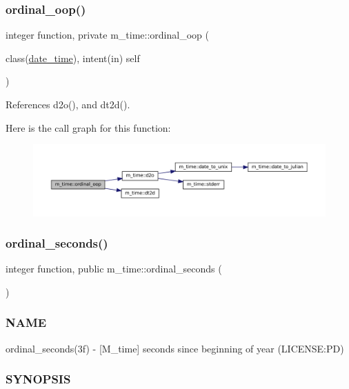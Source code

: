 \subsubsection{\texorpdfstring{ordinal\+\_\+oop()}{ordinal\_oop()}}
{\footnotesize\ttfamily integer function, private m\+\_\+time\+::ordinal\+\_\+oop (\begin{DoxyParamCaption}\item[{class(\mbox{\hyperlink{structm__time_1_1date__time}{date\+\_\+time}}), intent(in)}]{self }\end{DoxyParamCaption})\hspace{0.3cm}{\ttfamily [private]}}



References d2o(), and dt2d().

Here is the call graph for this function\+:\nopagebreak
\begin{figure}[H]
\begin{center}
\leavevmode
\includegraphics[width=350pt]{namespacem__time_a7fb507bb72a1872ec2a86fb7f3a50d75_cgraph}
\end{center}
\end{figure}
\mbox{\label{namespacem__time_ab8960d2aa60e134bcf77247d8b257963}} 
\subsubsection{\texorpdfstring{ordinal\+\_\+seconds()}{ordinal\_seconds()}}
{\footnotesize\ttfamily integer function, public m\+\_\+time\+::ordinal\+\_\+seconds (\begin{DoxyParamCaption}{ }\end{DoxyParamCaption})}



\subsubsection*{N\+A\+ME}

ordinal\+\_\+seconds(3f) -\/ \mbox{[}M\+\_\+time\mbox{]} seconds since beginning of year (L\+I\+C\+E\+N\+SE\+:PD) \subsubsection*{S\+Y\+N\+O\+P\+S\+IS}

